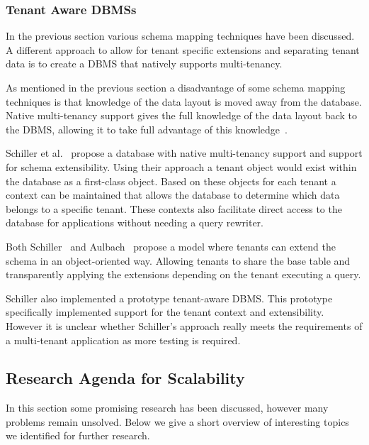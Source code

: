 \subsubsection{Tenant Aware \acp{DBMS}}
\label{sec:tenant_aware}
In the previous section various schema mapping techniques have been discussed.
A different approach to allow for tenant specific extensions and separating tenant data is to create a \ac{DBMS} that natively supports multi-tenancy.

As mentioned in the previous section a disadvantage of some schema mapping techniques is that knowledge of the data layout is moved away from the database.
Native multi-tenancy support gives the full knowledge of the data layout back to the \ac{DBMS}, allowing it to take full advantage of this knowledge~\cite{schiller2011native}.

Schiller et al.~\cite{schiller2011native} propose a database with native multi-tenancy support and support for schema extensibility.
Using their approach a tenant object would exist within the database as a first-class object. 
Based on these objects for each tenant a context can be maintained that allows the database to determine which data belongs to a specific tenant. 
These contexts also facilitate direct access to the database for applications without needing a query rewriter.

Both Schiller~\cite{schiller2011native} and Aulbach~\cite{aulbach2011extensibility} propose a model where tenants can extend the schema in an object-oriented way.
Allowing tenants to share the base table and transparently applying the extensions depending on the tenant executing a query.

Schiller also implemented a prototype tenant-aware \ac{DBMS}.
This prototype specifically implemented support for the tenant context and extensibility.
However it is unclear whether Schiller's approach really meets the requirements of a multi-tenant application as more testing is required.


\subsection{Research Agenda for Scalability}\label{sec:scal_agenda}
In this section some promising research has been discussed, however many problems remain unsolved.
Below we give a short overview of interesting topics we identified for further research.

